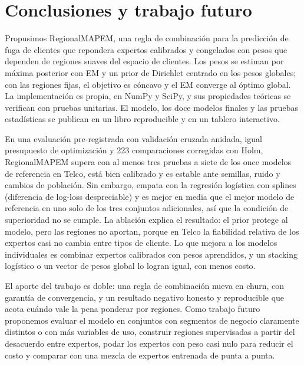\documentclass[11pt,a4paper]{article}
\begin{document}
\section{Conclusiones y trabajo futuro}\label{sec:conclusions}

Propusimos RegionalMAPEM, una regla de combinación para la predicción de fuga de clientes que repondera expertos calibrados y congelados con pesos que dependen de regiones suaves del espacio de clientes. Los pesos se estiman por máxima posterior con EM y un prior de Dirichlet centrado en los pesos globales; con las regiones fijas, el objetivo es cóncavo y el EM converge al óptimo global. La implementación es propia, en NumPy y SciPy, y sus propiedades teóricas se verifican con pruebas unitarias. El modelo, los doce modelos finales y las pruebas estadísticas se publican en un libro reproducible y en un tablero interactivo.

En una evaluación pre-registrada con validación cruzada anidada, igual presupuesto de optimización y 223 comparaciones corregidas con Holm, RegionalMAPEM supera con al menos tres pruebas a siete de los once modelos de referencia en Telco, está bien calibrado y es estable ante semillas, ruido y cambios de población. Sin embargo, empata con la regresión logística con splines (diferencia de log-loss despreciable) y es mejor en media que el mejor modelo de referencia en uno solo de los tres conjuntos adicionales, así que la condición de superioridad no se cumple. La ablación explica el resultado: el prior protege al modelo, pero las regiones no aportan, porque en Telco la fiabilidad relativa de los expertos casi no cambia entre tipos de cliente. Lo que mejora a los modelos individuales es combinar expertos calibrados con pesos aprendidos, y un stacking logístico o un vector de pesos global lo logran igual, con menos costo.

El aporte del trabajo es doble: una regla de combinación nueva en churn, con garantía de convergencia, y un resultado negativo honesto y reproducible que acota cuándo vale la pena ponderar por regiones. Como trabajo futuro proponemos evaluar el modelo en conjuntos con segmentos de negocio claramente distintos o con más variables de uso, construir regiones supervisadas a partir del desacuerdo entre expertos, podar los expertos con peso casi nulo para reducir el costo y comparar con una mezcla de expertos entrenada de punta a punta.

\end{document}
